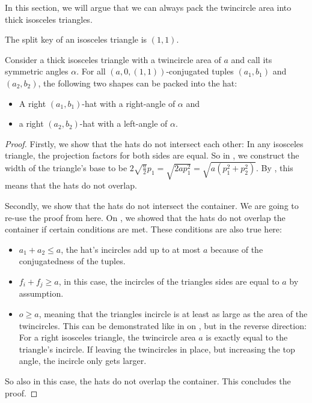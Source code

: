 \documentclass[a4paper,style=print,oneside,bibliography=totoc,nexus,lnum,extramargin]{tubsbook}
\begin{document}
In this section, we will argue that we can always pack the twincircle area into thick isosceles triangles.

\begin{definition}
    The split key of an isosceles triangle is $(1,1)$.
\end{definition}

\begin{lemma}\label{th:hats-in-iso}
    Consider a thick isosceles triangle with a twincircle area of $a$ and call its symmetric angles $\alpha$.
    For all $(a,0,(1,1))$-conjugated tuples $(a_1, b_1)$ and $(a_2, b_2)$, the following two shapes can be packed into the hat:
    \begin{itemize}
        \item A right $(a_1,b_1)$-hat with a right-angle of $\alpha$ and
        \item a right $(a_2,b_2)$-hat with a left-angle of $\alpha$.
    \end{itemize}
\end{lemma}

\begin{proof}
    Firstly, we show that the hats do not intersect each other: In any isosceles triangle, the projection factors for both sides are equal. So in , we construct the width of the triangle's base to be $2\sqrt{\frac{a}{2}}p_1 = \sqrt{2ap_1^2} = \sqrt{a(p_1^2+p_2^2)}$. By , this means that the hats do not overlap.


    Secondly, we show that the hats do not intersect the container. We are going to re-use the proof from  here. On , we showed that the hats do not overlap the container if certain conditions are met. These conditions are also true here:

    \begin{itemize}
        \item $a_1 + a_2 \le a$, the hat's incircles add up to at most $a$ because of the conjugatedness of the tuples.
        \item $f_i + f_j \ge a$, in this case, the incircles of the triangles sides are equal to $a$ by assumption.
        \item $o \ge a$, meaning that the triangles incircle is at least as large as the area of the twincircles. This can be demonstrated like in  on , but in the reverse direction: For a right isosceles triangle, the twincircle area $a$ is exactly equal to the triangle's incircle. If leaving the twincircles in place, but increasing the top angle, the incircle only gets larger.
    \end{itemize}

    So also in this case, the hats do not overlap the container. This concludes the proof.
\end{proof}
\end{document}

